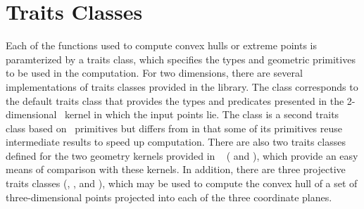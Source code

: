 \section{Traits Classes}

Each of the functions used to compute convex hulls or extreme points
is paramterized by a traits class, which specifies the types and geometric
primitives to be used in the computation.  For two dimensions, there are 
several implementations of traits classes provided in the library.  The class
corresponds to the default traits class that provides the types and 
predicates presented in the 2-dimensional \cgal\ kernel in which the input 
points lie.  The class 
is a second traits class based on \cgal\ primitives but differs from
 in that some of its primitives reuse
intermediate results to speed up computation.
There are also two traits classes defined for the two geometry kernels
provided in \leda\ \cite{mn-l-99} 
(
and 
), which provide an easy means of comparison with these kernels.
In addition, there are three projective traits classes 
(, 
, and 
), %
%
%
%
which may be used to compute the convex hull of a set of three-dimensional
points projected into each of the three coordinate planes.


